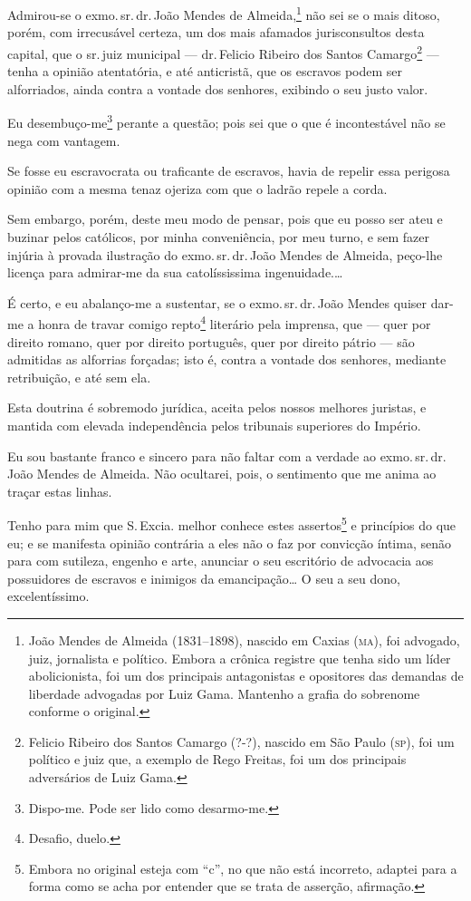 Admirou-se o exmo.\,sr.\,dr.\,João Mendes de
Almeida,\footnote{ João Mendes de Almeida
  (1831--1898), nascido em Caxias (\textsc{ma}), foi advogado, juiz, jornalista e
  político. Embora a crônica registre que tenha sido um líder
  abolicionista, foi um dos principais antagonistas e opositores das
  demandas de liberdade advogadas por Luiz Gama. Mantenho a grafia do
  sobrenome conforme o original.} não sei se o mais ditoso, porém, com
irrecusável certeza, um dos mais afamados jurisconsultos desta capital,
que o sr.\,juiz municipal --- dr.\,Felicio Ribeiro dos Santos
Camargo\footnote{ Felicio Ribeiro dos Santos Camargo (?-?), nascido
  em São Paulo (\textsc{sp}), foi um político e juiz que, a exemplo de Rego
  Freitas, foi um dos principais adversários de Luiz Gama.} --- tenha a
opinião atentatória, e até anticristã, que os escravos podem ser
alforriados, ainda contra a vontade dos senhores, exibindo o seu justo
valor.

Eu desembuço-me\footnote{ Dispo-me. Pode ser lido como desarmo-me.}
perante a questão; pois sei que o que é incontestável não se nega com
vantagem.

Se fosse eu escravocrata ou traficante de escravos, havia de repelir
essa perigosa opinião com a mesma tenaz ojeriza com que o ladrão repele
a corda.

Sem embargo, porém, deste meu modo de pensar, pois que eu posso ser ateu
e buzinar pelos católicos, por minha conveniência, por meu turno, e sem
fazer injúria à provada ilustração do exmo.\,sr.\,dr.\,João Mendes de
Almeida, peço-lhe licença para admirar-me da sua catolíssissima
ingenuidade.\ldots{}

É certo, e eu abalanço-me a sustentar, se o exmo.\,sr.\,dr.\,João Mendes
quiser dar-me a honra de travar comigo repto\footnote{ Desafio,
  duelo.} literário pela imprensa, que --- quer por direito romano, quer
por direito português, quer por direito pátrio --- são admitidas as
alforrias forçadas; isto é, contra a vontade dos senhores, mediante
retribuição, e até sem ela.

Esta doutrina é sobremodo jurídica, aceita pelos nossos melhores
juristas, e mantida com elevada independência pelos tribunais superiores
do Império.

Eu sou bastante franco e sincero para não faltar com a verdade ao exmo.\,sr.\,dr.\,João Mendes de Almeida. Não ocultarei, pois, o sentimento que me
anima ao traçar estas linhas.

Tenho para mim que S.\,Excia. melhor conhece estes assertos\footnote{
  Embora no original esteja com ``c'', no que não está incorreto,
  adaptei para a forma como se acha por entender que se trata de
  asserção, afirmação.} e princípios do que eu; e se manifesta opinião
contrária a eles não o faz por convicção íntima, senão para com
sutileza, engenho e arte, anunciar o seu escritório de advocacia aos
possuidores de escravos e inimigos da emancipação\ldots{} O seu a seu dono,
excelentíssimo.

